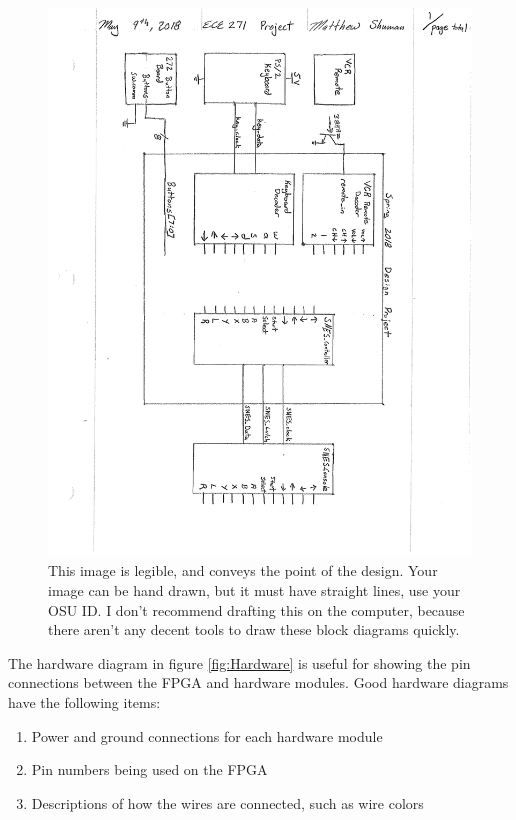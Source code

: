 \documentclass[a4paper]{article}
\begin{document}
\begin{figure}[h]
  \centering
    \includegraphics[width=.8\textwidth]{Images/2018Description.png}
	\caption{This image is legible, and conveys the point of the design.  Your image can be hand drawn, but it must have straight lines, use your OSU ID.  I don't recommend drafting this on the computer, because there aren't any decent tools to draw these block diagrams quickly.}
    \label{fig:2018Desc}
\end{figure}

\vspace{.25in}
The hardware diagram in figure \ref{fig:Hardware} is useful for showing the pin connections between the FPGA and hardware modules.  Good hardware diagrams have the following items:
\begin{enumerate}
\item Power and ground connections for each hardware module
\item Pin numbers being used on the FPGA
\item Descriptions of how the wires are connected, such as wire colors
\end{enumerate}
\end{document}
